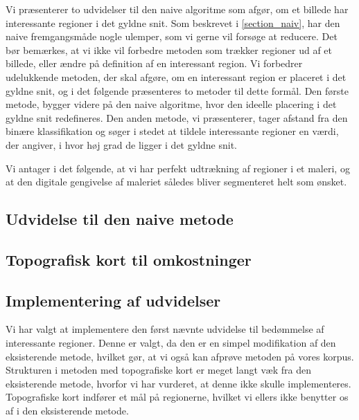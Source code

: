 {
{\sffamily Vi præsenterer to udvidelser til den naive algoritme som
afgør, om et billede har interessante regioner i det gyldne snit.  Som
beskrevet i \ref{section_naiv}, har den naive fremgangsmåde nogle
ulemper, som vi gerne vil forsøge at reducere. Det bør bemærkes, at vi
ikke vil forbedre metoden som trækker regioner ud af et billede, eller
ændre på definition af en interessant region. Vi forbedrer udelukkende
metoden, der skal afgøre, om en interessant region er placeret i det
gyldne snit, og i det følgende præsenteres to metoder til dette formål.
Den første metode, bygger videre på den naive algoritme, hvor den
ideelle placering i det gyldne snit redefineres. Den anden metode, vi
præsenterer, tager afstand fra den binære klassifikation og søger i
stedet at tildele interessante regioner en værdi, der angiver, i hvor
høj grad de ligger i det gyldne snit.

Vi antager i det følgende, at vi har perfekt udtrækning af regioner i et
maleri, og at den digitale gengivelse af maleriet således bliver
segmenteret helt som ønsket.
}

\subsection{Udvidelse til den naive metode\label{subsec_udvidet_massemidtpunkt}}


\subsection{Topografisk kort til omkostninger}


\subsection{Implementering af udvidelser}
Vi har valgt at implementere den først nævnte udvidelse til bedømmelse
af interessante regioner. Denne er valgt, da den er en simpel
modifikation af den eksisterende metode, hvilket gør, at vi også kan
afprøve metoden på vores korpus. Strukturen i metoden med topografiske
kort er meget langt væk fra den eksisterende metode, hvorfor vi har
vurderet, at denne ikke skulle implementeres. Topografiske kort indfører
et mål på regionerne, hvilket vi ellers ikke benytter os af i den
eksisterende metode.

}


